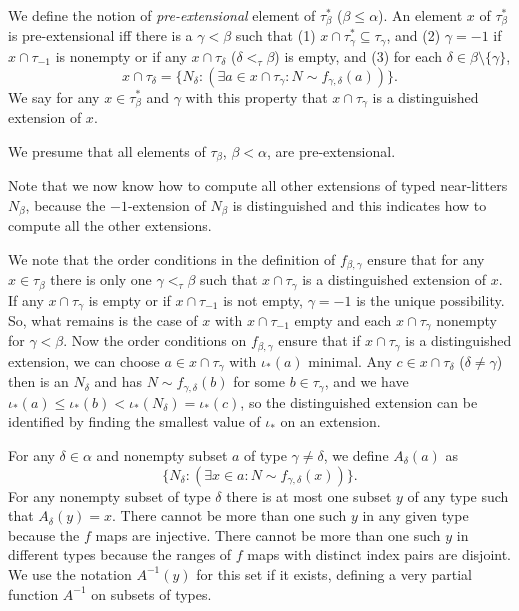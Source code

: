 \documentclass[112pt]{article}
\begin{document}
\begin{description}
We define the notion of {\em pre-extensional\/} element of $\tau^*_\beta$ ($\beta \leq \alpha$).   An element $x$ of $\tau^*_\beta$ is pre-extensional iff there is a $\gamma<\beta$ such that (1) $x \cap \tau^*_\gamma \subseteq \tau_\gamma$, and (2) $\gamma=-1$ if
$x \cap \tau_{-1}$ is nonempty or if any $x \cap \tau_\delta$ ($\delta <_\tau \beta$) is empty,  and (3) for each $\delta \in \beta \setminus \{\gamma\}$, $$x \cap \tau_\delta= \{N_\delta:(\exists a \in x \cap \tau_\gamma:N \sim f_{\gamma,\delta}(a))\}.$$  We say for any $x \in \tau^*_\beta$ and $\gamma$ with this property that $x \cap \tau_\gamma$ is a distinguished extension of $x$.

We presume that all elements of $\tau_\beta$, $\beta<\alpha$, are pre-extensional. 

 

Note that we now know how to compute all other extensions of typed near-litters $N_\beta$, because the $-1$-extension of $N_\beta$ is distinguished and this indicates how to compute all the other extensions.





We note that the order conditions in the definition of $f_{\beta,\gamma}$ ensure that for any $x \in \tau_\beta$ there is only one $\gamma <_\tau \beta$ such that $x \cap \tau_\gamma$ is a distinguished extension of $x$.  If any $x \cap \tau_\gamma$ is empty or if $x \cap \tau_{-1}$ is not empty, $\gamma= -1$ is the unique possibility.  So, what remains is the case of $x$ with $x \cap \tau_{-1}$ empty and each $x \cap \tau_\gamma$ nonempty for $\gamma<\beta$.
Now the order conditions on $f_{\beta,\gamma}$ ensure that if $x \cap \tau_\gamma$ is a distinguished extension,
we can choose $a \in x \cap \tau_\gamma$ with $\iota_*(a)$ minimal.  Any $c \in x \cap \tau_\delta$ ($\delta \neq \gamma$) then is an $N_\delta$ and
has $N \sim f_{\gamma,\delta}(b)$ for some $b \in \tau_\gamma$, and we have $\iota_*(a) \leq \iota_*(b) < \iota_*(N_\delta) = \iota_*(c)$, so the distinguished extension can be identified by finding the smallest value of
$\iota_*$ on an extension.



For any $\delta \in \alpha$ and nonempty subset $a$ of type $\gamma \neq \delta$, we define $A_\delta(a)$ as $$\{N_\delta:(\exists x \in a:N \sim f_{\gamma,\delta}(x))\}.$$  For any nonempty subset of type $\delta$ there is at most one subset $y$ of any type such that $A_\delta(y)=x$.  There cannot be more than one such $y$ in any given type because the $f$ maps are injective.  There cannot be more than one such $y$ in different types because the ranges of $f$ maps with distinct index pairs are disjoint.   We use the notation $A^{-1}(y)$ for this set if it exists, defining a very partial function $A^{-1}$ on subsets of types.


\end{description}
\end{document}
